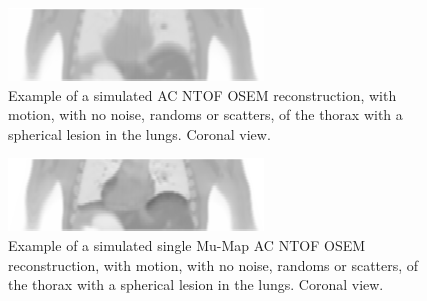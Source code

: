             \begin{figure}
                \centering
                
                \includegraphics[width=1.0\linewidth]{figures/background_motion_artefact_example.png}
                
                \captionsetup{singlelinecheck=false, justification=raggedright}
                \caption{Example of a simulated \gls{AC} \gls{NTOF} \gls{OSEM} reconstruction, with motion, with no noise, randoms or scatters, of the thorax with a spherical lesion in the lungs. Coronal view.}
                \label{fig:respiratory_motion_artefacts_motion_artefact}
            \end{figure}
            
            \begin{figure}
                \centering
                
                \includegraphics[width=1.0\linewidth]{figures/background_single_mu-map_ac_example.png}
                
                \captionsetup{singlelinecheck=false, justification=raggedright}
                \caption{Example of a simulated single \gls{Mu-Map} \gls{AC} \gls{NTOF} \gls{OSEM} reconstruction, with motion, with no noise, randoms or scatters, of the thorax with a spherical lesion in the lungs. Coronal view.}
                \label{fig:respiratory_motion_artefacts_single_mu-map_ac}
            \end{figure}
            
